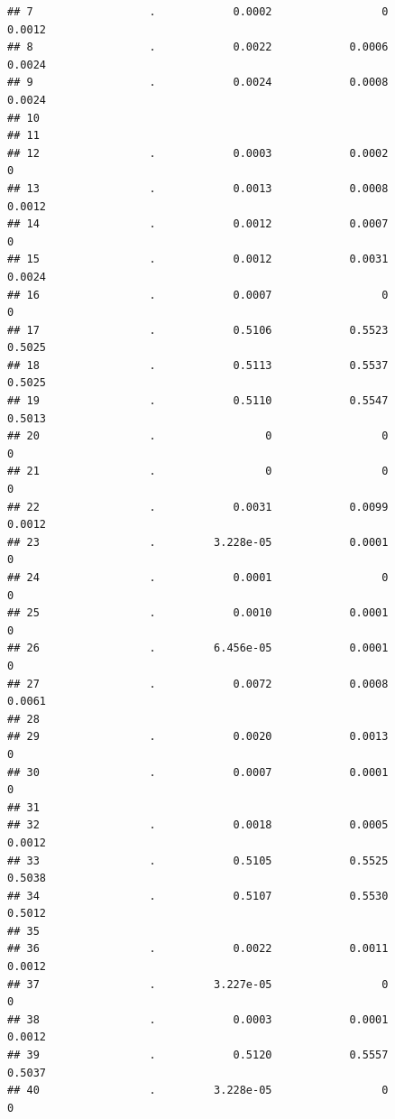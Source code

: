 \documentclass[
]{article}
\begin{document}
\begin{verbatim}
## 7                  .            0.0002                 0            0.0012
## 8                  .            0.0022            0.0006            0.0024
## 9                  .            0.0024            0.0008            0.0024
## 10                                                                        
## 11                                                                        
## 12                 .            0.0003            0.0002                 0
## 13                 .            0.0013            0.0008            0.0012
## 14                 .            0.0012            0.0007                 0
## 15                 .            0.0012            0.0031            0.0024
## 16                 .            0.0007                 0                 0
## 17                 .            0.5106            0.5523            0.5025
## 18                 .            0.5113            0.5537            0.5025
## 19                 .            0.5110            0.5547            0.5013
## 20                 .                 0                 0                 0
## 21                 .                 0                 0                 0
## 22                 .            0.0031            0.0099            0.0012
## 23                 .         3.228e-05            0.0001                 0
## 24                 .            0.0001                 0                 0
## 25                 .            0.0010            0.0001                 0
## 26                 .         6.456e-05            0.0001                 0
## 27                 .            0.0072            0.0008            0.0061
## 28                                                                        
## 29                 .            0.0020            0.0013                 0
## 30                 .            0.0007            0.0001                 0
## 31                                                                        
## 32                 .            0.0018            0.0005            0.0012
## 33                 .            0.5105            0.5525            0.5038
## 34                 .            0.5107            0.5530            0.5012
## 35                                                                        
## 36                 .            0.0022            0.0011            0.0012
## 37                 .         3.227e-05                 0                 0
## 38                 .            0.0003            0.0001            0.0012
## 39                 .            0.5120            0.5557            0.5037
## 40                 .         3.228e-05                 0                 0

\end{verbatim}
\end{document}
